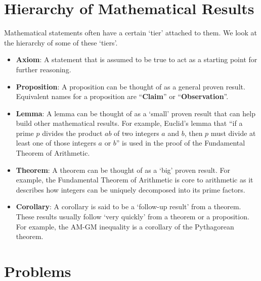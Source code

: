 \section{Hierarchy of Mathematical Results}
Mathematical statements often have a certain `tier' attached to them. We look at the hierarchy of some of these `tiers'.
\begin{itemize}
    \item \textbf{Axiom}: A statement that is assumed to be true to act as a starting point for further reasoning.
    \item \textbf{Proposition}: A proposition can be thought of as a general proven result. Equivalent names for a proposition are ``\textbf{Claim}'' or ``\textbf{Observation}''.
    \item \textbf{Lemma}: A lemma can be thought of as a `small' proven result that can help build other mathematical results. For example, Euclid's lemma that ``if a prime $p$ divides the product $ab$ of two integers $a$ and $b$, then $p$ must divide at least one of those integers $a$ or $b$'' is used in the proof of the Fundamental Theorem of Arithmetic.
    \item \textbf{Theorem}: A theorem can be thought of as a `big' proven result. For example, the Fundamental Theorem of Arithmetic is core to arithmetic as it describes how integers can be uniquely decomposed into its prime factors.
    \item \textbf{Corollary}: A corollary is said to be a `follow-up result' from a theorem. These results usually follow `very quickly' from a theorem or a proposition. For example, the AM-GM inequality is a corollary of the Pythagorean theorem.
\end{itemize}

\newpage

\section{Problems}
